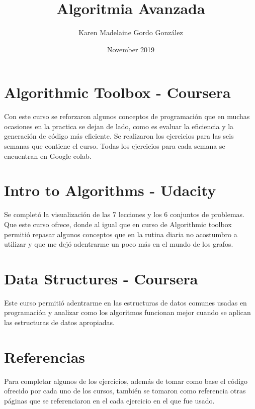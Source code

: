 \documentclass{article}
\title{Algoritmia Avanzada}
\author{Karen Madelaine Gordo González }
\date{November 2019}
\begin{document}
\maketitle

\section{Algorithmic Toolbox - Coursera}
Con este curso se reforzaron algunos conceptos de programación que en muchas ocasiones en la practica se dejan de lado, como es evaluar la eficiencia y la generación de código más eficiente. Se realizaron los ejercicios para las seis semanas que contiene el curso. Todas los ejercicios para cada semana se encuentran en Google colab.

\section{Intro to Algorithms - Udacity}
Se completó la visualización de las 7 lecciones y los 6 conjuntos de problemas. Que este curso ofrece, donde al igual que en curso de Algorithmic toolbox permitió repasar algunos conceptos que en la rutina diaria no acostumbro a utilizar y que me dejó adentrarme un poco más en el mundo de los grafos.

\section{Data Structures - Coursera}

Este curso permitió adentrarme en las estructuras de datos comunes usadas en programación y analizar como los algoritmos funcionan mejor cuando se aplican las estructuras de datos apropiadas.


\section{Referencias}

Para completar algunos de los ejercicios, además de tomar como base el código ofrecido por cada uno de los cursos, también se tomaron como referencia otras páginas que se referenciaron en el cada ejercicio en el que fue usado.
\end{document}
